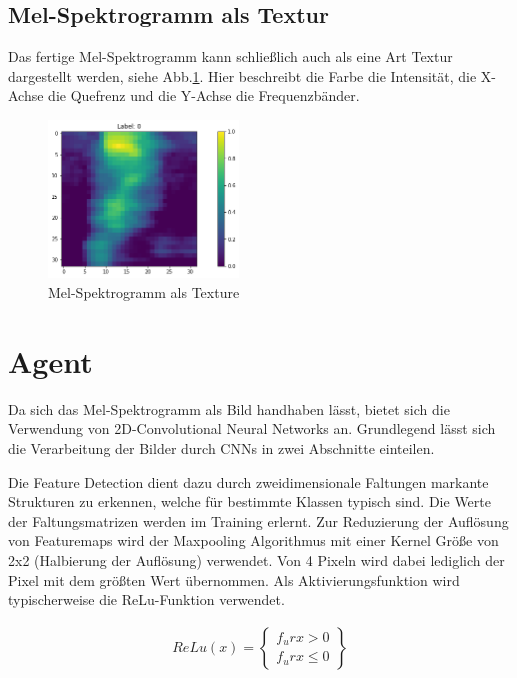 \documentclass[sigconf]{acmart}
\begin{document}
\subsection{Mel-Spektrogramm als Textur}
Das fertige Mel-Spektrogramm kann schließlich auch als eine Art Textur dargestellt werden, siehe Abb.\ref{fig:MelTextur}.  
Hier beschreibt die Farbe die Intensität, die X-Achse die Quefrenz und die Y-Achse die Frequenzbänder. 
\begin{figure}[H]
  \includegraphics[width=0.45\textwidth]{images/Mel}
  \caption{Mel-Spektrogramm als Texture}
  \Description{}
  \label{fig:MelTextur}
\end{figure}

\section{Agent}
Da sich das Mel-Spektrogramm als Bild handhaben lässt, bietet sich die Verwendung von 2D-Convolutional Neural Networks an. Grundlegend lässt sich die Verarbeitung der Bilder durch CNNs in zwei Abschnitte einteilen. 

Die Feature Detection dient dazu durch zweidimensionale Faltungen markante Strukturen zu erkennen, welche für bestimmte Klassen typisch sind. Die Werte der Faltungsmatrizen werden im Training erlernt. Zur Reduzierung der Auflösung von Featuremaps wird der Maxpooling Algorithmus mit einer Kernel Größe von 2x2 (Halbierung der Auflösung) verwendet. Von 4 Pixeln wird dabei lediglich der Pixel mit dem größten Wert übernommen. Als Aktivierungsfunktion wird typischerweise die ReLu-Funktion verwendet. 

\begin{align}
ReLu(x) = \begin{Bmatrix}
f_{u}rx>0 \\
f_{u}rx \leq 0
\end{Bmatrix}
\end{align}
\end{document}
